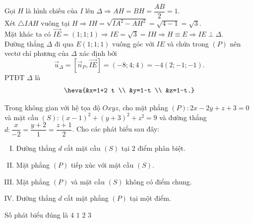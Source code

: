 \begin{ex}
{	Gọi $H$ là hình chiếu của $I$ lên $\Delta \Rightarrow A H=B H=\dfrac{A B}{2}=1$.\\
	Xét $\triangle I A H$ vuông tại $H \Rightarrow I H=\sqrt{I A^2-A H^2}=\sqrt{4-1}=\sqrt{3}$.\\
	Mặt khác ta có $\overrightarrow{I E}=(1; 1; 1) \Rightarrow I E=\sqrt{3}=I H \Rightarrow H \equiv E \Rightarrow I E \perp \Delta$.\\
	Đường thẳng $\Delta$ đi qua $E(1; 1; 1)$ vuông góc với $I E$ và chứa trong $(P)$ nên	vectơ chỉ phương của $\Delta$ xác định bởi $$\overrightarrow{u}_{\Delta}=\left[\overrightarrow{n}_P, \overrightarrow{I E}\right]=(-8; 4; 4)=-4(2;-1;-1).$$
	PTĐT $\Delta$ là $$\heva{&x=1+2 t \\ &y=1-t \\ &z=1-t.}$$	
	}
\end{ex}
\begin{ex}%
	Trong không gian với hệ tọa độ $O x y z$, cho mặt phẳng $(P)\colon 2 x-2 y+z+3=0$ và mặt cầu $(S)\colon(x-1)^2+(y+3)^2+z^2=9$ và đường thẳng $d\colon \dfrac{x}{-2}=\dfrac{y+2}{1}=\dfrac{z+1}{2}$. Cho các phát biểu sau đây:
	\begin{enumerate}[I. ]
	\item Đường thẳng $d$ cắt mặt cầu $(S)$ tại 2 điểm phân biệt.
	\item Mặt phẳng $(P)$ tiếp xúc với mặt cầu $(S)$.
	\item Mặt phẳng $(P)$ và mặt cầu $(S)$ không có điểm chung.
	\item Đường thẳng $d$ cắt mặt phẳng $(P)$ tại một điểm.	
	\end{enumerate}
	Số phát biểu đúng là
	\choice
	{$4$}
	{$1$}
	{$2$}
	{\True $3$}
\end{ex} 

